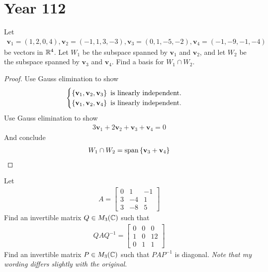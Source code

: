 \documentclass{report}
\begin{document}
\section{Year 112}
\begin{question}{}{}
Let 
\begin{align*}
\textbf{v}_1= (1,2,0,4),\textbf{v}_2=(-1,1,3,-3),\textbf{v}_3= (0,1,-5,-2),\textbf{v}_4=(-1,-9,-1,-4)
\end{align*}
be vectors in $\mathbb{R}^4$. Let $W_1$ be the subspace spanned by  $\textbf{v}_1$ and $\textbf{v}_2$, and let $W_2$ be the subspace spanned by $\textbf{v}_3$ and $\textbf{v}_4$. Find a basis for $W_1 \cap W_2$. 
\end{question}
\begin{proof}
Use Gauss elimination to show 
\begin{align*}
\begin{cases}
  \left\{ \textbf{v}_1,\textbf{v}_2,\textbf{v}_3 \right\}\text{ is linearly independent. }\\
  \left\{ \textbf{v}_1,\textbf{v}_2,\textbf{v}_4 \right\}\text{ is linearly independent. }
\end{cases}
\end{align*}
Use Gauss elimination to show 
\begin{align*}
3\textbf{v}_1+ 2\textbf{v}_2 +\textbf{v}_3+ \textbf{v}_4=0
\end{align*}
And conclude 
\begin{align*}
W_1 \cap W_2= \operatorname{span} \left\{ \textbf{v}_3+\textbf{v}_4 \right\}
\end{align*}
\end{proof}
\begin{question}{}{}
Let 
\begin{align*}
A= \begin{bmatrix}
  0 & 1 & -1 \\
  3 & -4 & 1 \\
  3 & -8 & 5 
\end{bmatrix}
\end{align*}
Find an invertible matrix $Q\in M_3(\mathbb{C})$ such that 
\begin{align*}
QAQ^{-1}= \begin{bmatrix}
  0 & 0 & 0 \\
  1 & 0 & 12 \\
  0 & 1 & 1
\end{bmatrix}
\end{align*}
Find an invertible matrix $P \in M_3  (\mathbb{C})$ such that $PAP^{-1}$ is diagonal. \emph{Note that my wording differs slightly with the original}.  
\end{question}
\end{document}
